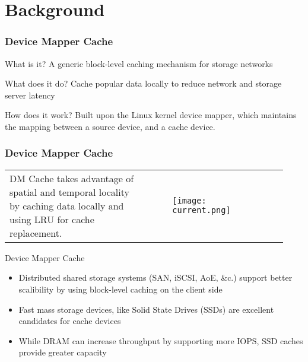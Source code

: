 \section{Background}
%
\begin{frame}
    \frametitle{Device Mapper Cache}
    \begin{block}{What is it?}
	A generic block-level caching mechanism
	for storage networks
    \end{block}
    \vspace{2ex}
    \begin{block}{What does it do?}
	Cache popular data locally to reduce
	network and storage server latency
    \end{block}
    \vspace{2ex}
    \begin{block}{How does it work?}
	Built upon the Linux kernel device mapper, which
	maintains the mapping between a source device, and
	a cache device.
    \end{block}
\end{frame}
\begin{frame}
    \frametitle{Device Mapper Cache}
    \begin{tabular}{m{0.465\linewidth}m{0.465\linewidth}}
	DM Cache takes advantage of spatial and temporal
	locality by caching data locally and using LRU for
	cache replacement. &
	\begin{figure}
	    \centering \texttt{[image: current.png]}
	    \label{fig:dm}
	\end{figure} \\
    \end{tabular}
    \begin{block}{Device Mapper Cache}
	\begin{itemize}
	    \item Distributed shared storage systems (SAN, iSCSI, AoE, \&c.)
		support better scalibility by using block-level caching
		on the client side
	    \item Fast mass storage devices, like Solid State Drives (SSDs) 
		are excellent candidates for cache devices
	    \item While DRAM can increase throughput by
		supporting more IOPS, SSD caches provide greater capacity
	\end{itemize}
    \end{block}
\end{frame}
